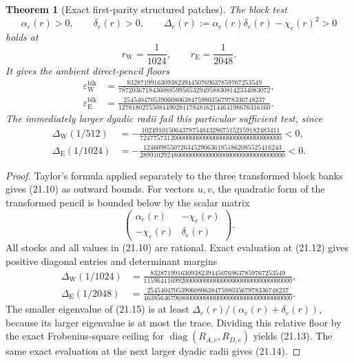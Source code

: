 \documentclass[11pt,oneside]{article}
\newtheorem{theorem}{Theorem}[section]
\theoremstyle{definition}
\theoremstyle{remark}
\begin{document}
\begin{theorem}[Exact first-parity structured patches]
\label{thm:newv21-patches}
The block test
\[
 \alpha_e(r)>0,\qquad \delta_e(r)>0,\qquad
 \Delta_e(r):=\alpha_e(r)\delta_e(r)-\chi_e(r)^2>0        \tag{21.11}
\]
holds at
\[
 r_{\mathrm W}=\frac1{1024},\qquad
 r_{\mathrm E}=\frac1{2048}.                             \tag{21.12}
\]
It gives the ambient direct-pencil floors
\[
\begin{aligned}
\varepsilon_{\mathrm W}^{\mathrm{blk}}
&=\frac{
8328719916309382394450769637859767253549}
{787203671843608859956532949588308142334083072},\\
\varepsilon_{\mathrm E}^{\mathrm{blk}}
&=\frac{
254540470539060806384759803567978336748237}
{127818027550844902811784816214464198676316160}.
\end{aligned}                                            \tag{21.13}
\]
The immediately larger dyadic radii fail this particular sufficient
test, since
\[
\begin{aligned}
\Delta_{\mathrm W}(1/512)
&=-\frac{
10249101506437875464328675152159182483411}
{724775731200000000000000000000000000000000}<0,\\
\Delta_{\mathrm E}(1/1024)
&=-\frac{
12460985507263452906361851862085525416243}
{2899102924800000000000000000000000000000000}<0.
\end{aligned}                                            \tag{21.14}
\]
\end{theorem}

\begin{proof}
Taylor's formula applied separately to the three transformed block
banks gives (21.10) as outward bounds.  For vectors \(u,v\), the
quadratic form of the transformed pencil is bounded below by the
scalar matrix
\[
 \begin{pmatrix}\alpha_e(r)&-\chi_e(r)\\
 -\chi_e(r)&\delta_e(r)\end{pmatrix}.                    \tag{21.15}
\]
All stocks and all values in (21.10) are rational.  Exact evaluation
at (21.12) gives positive diagonal entries and determinant margins
\[
\begin{aligned}
\Delta_{\mathrm W}(1/1024)
&=\frac{
8328719916309382394450769637859767253549}
{11596411699200000000000000000000000000000000},\\
\Delta_{\mathrm E}(1/2048)
&=\frac{
254540470539060806384759803567978336748237}
{46385646796800000000000000000000000000000000}.
\end{aligned}                                            \tag{21.16}
\]
The smaller eigenvalue of (21.15) is at least
\(\Delta_e(r)/(\alpha_e(r)+\delta_e(r))\), because its larger
eigenvalue is at most the trace.  Dividing this relative floor by
the exact Frobenius-square ceiling for
\(\operatorname{diag}(R_{A,e},R_{D,e})\) yields (21.13).
The same exact evaluation at the next larger dyadic radii gives
(21.14).
\end{proof}
\end{document}
